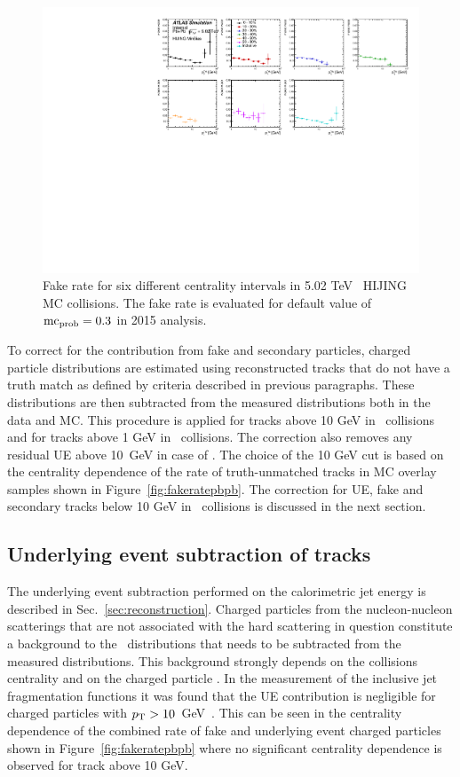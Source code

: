 \begin{figure}
\centering
\includegraphics[width=1.\textwidth]{figures/main/performance/fake_rate_hijingMB.pdf}
\caption{ Fake rate for six different centrality intervals in 5.02 TeV \pbpb\ HIJING MC collisions.
The fake rate is evaluated for default value of $\mbox{${\mathrm{mc}}_{\mathrm{prob}}$} = 0.3$ in 2015 analysis.}
\label{fig:fakeratehijing}
\end{figure}


To correct for the contribution from fake and secondary particles, charged particle distributions are estimated using reconstructed tracks that do not have a truth match as defined by criteria described in previous paragraphs.
These distributions are then subtracted from the measured distributions both in the data and MC.
This procedure is applied for tracks above 10 GeV in \PbPb\ collisions and for tracks above 1 GeV in \pp\ collisions.
The correction also removes any residual UE above 10~GeV in case of \PbPb.
The choice of the 10 GeV cut is based on the centrality dependence of the rate of truth-unmatched tracks in MC overlay samples shown in Figure~\ref{fig:fakeratepbpb}.
The correction for UE, fake and secondary tracks below 10 GeV in \PbPb\ collisions is discussed in the next section.


\subsection{Underlying event subtraction of tracks}
\label{sec:cuts_UE}
The underlying event subtraction performed on the calorimetric jet energy is described in Sec.~\ref{sec:reconstruction}.
Charged particles from the nucleon-nucleon scatterings that are not associated with the hard scattering in question constitute a background to the \Dptr\ distributions that needs to be subtracted from the measured distributions.
This background strongly depends on the collisions centrality and on the charged particle \pt.
In the measurement of the inclusive jet fragmentation functions it was found that the UE contribution is negligible for charged particles with $\mbox{$p_{\mathrm{T}}$}>10$~GeV~\cite{PhysRevC.98.024908}.
This can be seen in the centrality dependence of the combined rate of fake and underlying event charged particles shown in Figure~\ref{fig:fakeratepbpb} where no significant centrality dependence is observed for track above 10 GeV.

